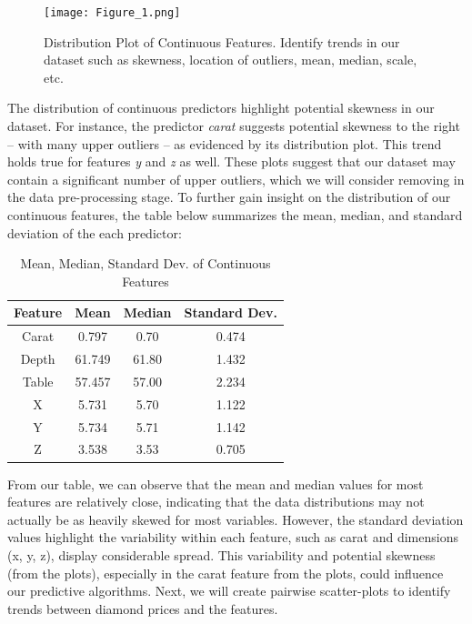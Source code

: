 \documentclass[conference]{IEEEtran}
\begin{document}
\begin{figure}[H]
    \centering
    \texttt{[image: Figure\_1.png]}
    \caption{Distribution Plot of Continuous Features. Identify trends in our dataset such as skewness, location of outliers, mean, median, scale, etc.}
    \label{fig:image_label}
\end{figure}

The distribution of continuous predictors highlight potential skewness in our dataset. For instance, the predictor \emph{carat} suggests potential skewness to the right – with many upper outliers – as evidenced by its distribution plot. This trend holds true for features \emph{y} and \emph{z} as well. These plots suggest that our dataset may contain a significant number of upper outliers, which we will consider removing in the data pre-processing stage. To further gain insight on the distribution of our continuous features, the table below summarizes the mean, median, and standard deviation of the each predictor:

\begin{table}[H]
    \centering
    \caption{Mean, Median, Standard Dev. of Continuous Features}
    \label{tab:example_table}
    \begin{tabular}{|c|c|c|c|}
        \hline
        Feature & Mean & Median & Standard Dev. \\
        \hline
        Carat & 0.797 & 0.70 & 0.474 \\
        \hline
        Depth & 61.749 & 61.80  & 1.432 \\
        \hline
        Table & 57.457 & 57.00 & 2.234 \\
        \hline
        X & 5.731 & 5.70 & 1.122 \\
        \hline
        Y & 5.734 & 5.71 & 1.142 \\
        \hline
        Z & 3.538 & 3.53 & 0.705 \\
        \hline
    \end{tabular}
\end{table}

From our table, we can observe that the mean and median values for most features are relatively close, indicating that the data distributions may not actually be as heavily skewed for most variables. However, the standard deviation values highlight the variability within each feature, such as carat and dimensions (x, y, z), display considerable spread. This variability and potential skewness (from the plots), especially in the carat feature from the plots, could influence our predictive algorithms. Next, we will create pairwise scatter-plots to identify trends between diamond prices and the features.
\end{document}
